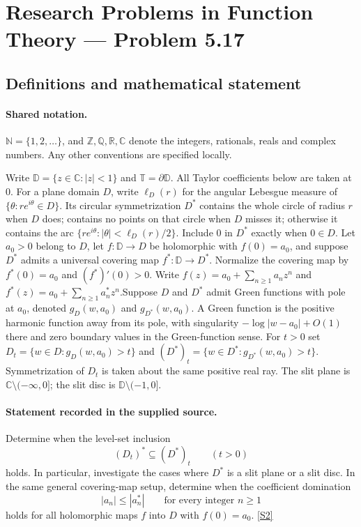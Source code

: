 \documentclass[11pt]{article}
\newcommand{\sref}[2]{\hyperlink{source:#1:#2}{[S#2]}}
\begin{document}
\section{Research Problems in Function Theory — Problem 5.17}\label{statement}

\subsection{Definitions and mathematical statement}

\paragraph{Shared notation.}$\mathbb N=\{1,2,\ldots\}$, and $\mathbb Z,\mathbb Q,\mathbb R,\mathbb C$ denote the integers, rationals, reals and complex numbers. Any other conventions are specified locally.


Write $\mathbb D=\{z\in\mathbb C:|z|<1\}$ and $\mathbb T=\partial\mathbb D$. All Taylor coefficients below are taken at $0$. For a plane domain $D$, write $\ell_D(r)$ for the angular Lebesgue measure of $\{\theta:re^{i\theta}\in D\}$. Its circular symmetrization $D^*$ contains the whole circle of radius $r$ when $D$ does; contains no points on that circle when $D$ misses it; otherwise it contains the arc $\{re^{i\theta}:|\theta|<\ell_D(r)/2\}$. Include $0$ in $D^*$ exactly when $0\in D$. Let $a_0>0$ belong to $D$, let $f:\mathbb D\to D$ be holomorphic with $f(0)=a_0$, and suppose $D^*$ admits a universal covering map $f^*:\mathbb D\to D^*$. Normalize the covering map by $f^*(0)=a_0$ and $(f^*)'(0)>0$. Write $f(z)=a_0+\sum_{n\ge1}a_nz^n$ and $f^*(z)=a_0+\sum_{n\ge1}a_n^*z^n$.Suppose $D$ and $D^*$ admit Green functions with pole at $a_0$, denoted $g_D(w,a_0)$ and $g_{D^*}(w,a_0)$. A Green function is the positive harmonic function away from its pole, with singularity $-\log|w-a_0|+O(1)$ there and zero boundary values in the Green-function sense. For $t>0$ set $D_t=\{w\in D:g_D(w,a_0)>t\}$ and $(D^*)_t=\{w\in D^*:g_{D^*}(w,a_0)>t\}$. Symmetrization of $D_t$ is taken about the same positive real ray. The slit plane is $\mathbb C\setminus(-\infty,0]$; the slit disc is $\mathbb D\setminus(-1,0]$.
\paragraph{Statement recorded in the supplied source.}
Determine when the level-set inclusion
\[(D_t)^*\subseteq(D^*)_t\qquad(t>0)\]
holds. In particular, investigate the cases where $D^*$ is a slit plane or a slit disc. In the same general covering-map setup, determine when the coefficient domination
\[|a_n|\le |a_n^*|\qquad\text{for every integer }n\ge1\]
holds for all holomorphic maps $f$ into $D$ with $f(0)=a_0$. \sref{statement}{2}
\end{document}
